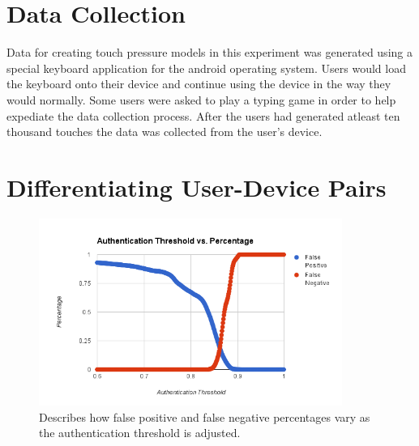 \documentclass{acm_proc_article-sp}
\begin{document}
\section{Data Collection}
\label{sec:differentiation}
Data for creating touch pressure models in this experiment was generated using a special keyboard application for the android operating system. Users would load the keyboard onto their device and continue using the device in the way they would normally. Some users were asked to play a typing game in order to help expediate the data collection process. After the users had generated atleast ten thousand touches the data was collected from the user's device.

\section{Differentiating User-Device Pairs}
\label{sec:differentiation}

\begin{figure}
\centering
\includegraphics[width=3.9in]{threshold_vs_percentages.png}
\caption{Describes how false positive and false negative percentages vary as the authentication threshold is adjusted.}
\label{fig:threshold_vs_percentages}
\end{figure}
\end{document}
